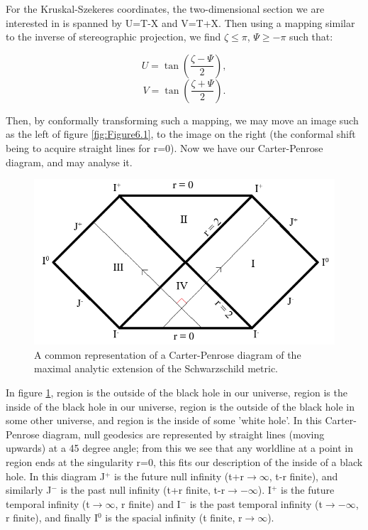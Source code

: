 \documentclass[oneside,openright,frontopenright, singlespacing]{dmathesis}
\begin{document}
\vspace{1em}
	For the Kruskal-Szekeres coordinates, the two-dimensional section we are interested in is spanned by U=T-X and V=T+X. Then using a mapping similar to the inverse of stereographic projection, we find $\zeta\leq\pi$, $\Psi\geq-\pi$ such that:

	\[U = \tan\left(\frac{\zeta-\Psi}{2}\right),\]
	\[V = \tan\left(\frac{\zeta+\Psi}{2}\right).\]

\vspace{1em}
	Then, by conformally transforming such a mapping, we may move an image such as the left of figure \ref{fig:Figure6.1}, to the image on the right (the conformal shift being to acquire straight lines for r=0). Now we have our Carter-Penrose diagram, and may analyse it.

\vspace{1em}
\begin{figure}[!ht]
	\centering
	\includegraphics[width=0.6\linewidth]{img/carter-penrose3}
	\caption{A common representation of a Carter-Penrose diagram of the maximal analytic extension of the Schwarzschild metric.}
	\label{fig:Figure6.2}
\end{figure}

\vspace{1em}
	In figure \ref{fig:Figure6.2}, region  is the outside of the black hole in our universe, region  is the inside of the black hole in our universe, region  is the outside of the black hole in some other universe, and region  is the inside of some 'white hole'. In this Carter-Penrose diagram, null geodesics are represented by straight lines (moving upwards) at a 45 degree angle; from this we see that any worldline at a point in region  ends at the singularity r=0, this fits our description of the inside of a black hole. In this diagram J$^+$ is the future null infinity (t+r$\rightarrow\infty$, t-r finite), and similarly J$^-$ is the past null infinity (t+r finite, t-r$\rightarrow-\infty$). I$^+$ is the future temporal infinity (t$\rightarrow\infty$, r finite) and I$^-$ is the past temporal infinity (t$\rightarrow-\infty$, r finite), and finally I$^0$ is the spacial infinity (t finite, r$\rightarrow\infty$).
\end{document}
